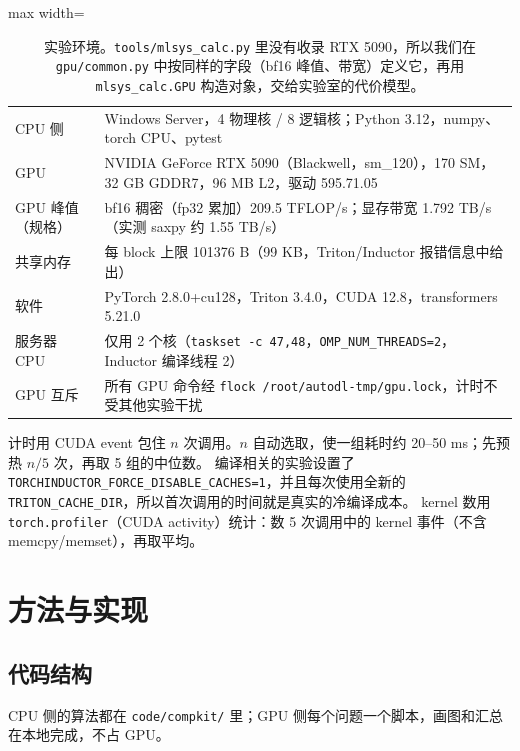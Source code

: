 \documentclass[11pt,a4paper]{ctexart}
\begin{document}
\begin{table}[H]
\centering\small
\begin{adjustbox}{max width=\linewidth}\begin{tabular}{ll}
\toprule
CPU 侧 & Windows Server，4 物理核 / 8 逻辑核；Python 3.12，numpy、torch CPU、pytest \\
GPU & NVIDIA GeForce RTX 5090（Blackwell，sm\_120），170 SM，32 GB GDDR7，96 MB L2，驱动 595.71.05 \\
GPU 峰值（规格） & bf16 稠密（fp32 累加）209.5 TFLOP/s；显存带宽 1.792 TB/s（实测 saxpy 约 1.55 TB/s） \\
共享内存 & 每 block 上限 101376 B（99 KB，Triton/Inductor 报错信息中给出） \\
软件 & PyTorch 2.8.0+cu128，Triton 3.4.0，CUDA 12.8，transformers 5.21.0 \\
服务器 CPU & 仅用 2 个核（\texttt{taskset -c 47,48}，\texttt{OMP\_NUM\_THREADS=2}，Inductor 编译线程 2） \\
GPU 互斥 & 所有 GPU 命令经 \texttt{flock /root/autodl-tmp/gpu.lock}，计时不受其他实验干扰 \\
\bottomrule
\end{tabular}\end{adjustbox}
\caption{实验环境。\texttt{tools/mlsys\_calc.py} 里没有收录 RTX 5090，所以我们在 \texttt{gpu/common.py} 中按同样的字段（bf16 峰值、带宽）定义它，再用 \texttt{mlsys\_calc.GPU} 构造对象，交给实验室的代价模型。}
\end{table}

计时用 CUDA event 包住 $n$ 次调用。$n$ 自动选取，使一组耗时约 20--50 ms；先预热 $n/5$ 次，再取 5 组的中位数。
编译相关的实验设置了 \texttt{TORCHINDUCTOR\_FORCE\_DISABLE\_CACHES=1}，并且每次使用全新的 \texttt{TRITON\_CACHE\_DIR}，所以首次调用的时间就是真实的冷编译成本。
kernel 数用 \texttt{torch.profiler}（CUDA activity）统计：数 5 次调用中的 kernel 事件（不含 memcpy/memset），再取平均。

\section{方法与实现}

\subsection{代码结构}

CPU 侧的算法都在 \texttt{code/compkit/} 里；GPU 侧每个问题一个脚本，画图和汇总在本地完成，不占 GPU。
\end{document}
